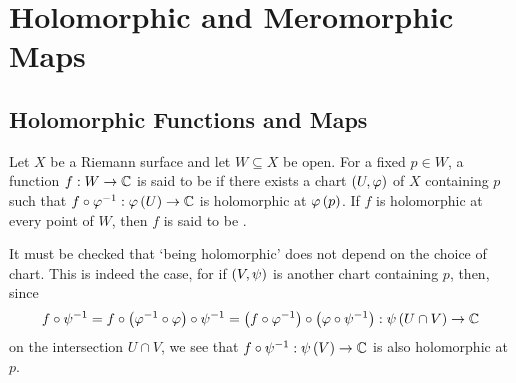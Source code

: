 \documentclass[../Moduli_Spaces_of_Riemann_Surfaces.tex]{subfiles}
\begin{document}
    \section{Holomorphic and Meromorphic Maps}
    \subsection{Holomorphic Functions and Maps}
    \begin{definition}
        Let $X$ be a Riemann surface and let $W\subseteq X$ be open. For a fixed $p\in W$, a function $f:W\to\mathbb{C}$ is said to be  if there exists a chart $\left(U,\varphi\right)$ of $X$ containing $p$ such that $f\circ\varphi^{-1}:\varphi\left(U\right)\to\mathbb{C}$ is holomorphic at $\varphi\left(p\right)$. If $f$ is holomorphic at every point of $W$, then $f$ is said to be .
    \end{definition}
    \begin{remark}
        It must be checked that $\textrm{`}$being holomorphic$\textrm{'}$ does not depend on the choice of chart. This is indeed the case, for if $\left(V,\psi\right)$ is another chart containing $p$, then, since
        \begin{equation*}
            f\circ\psi^{-1}=f\circ\left(\varphi^{-1}\circ\varphi\right)\circ\psi^{-1}=\left(f\circ\varphi^{-1}\right)\circ\left(\varphi\circ\psi^{-1}\right):\psi\left(U\cap V\right)\to\mathbb{C}
        \end{equation*}
        on the intersection $U\cap V$, we see that $f\circ\psi^{-1}:\psi\left(V\right)\to\mathbb{C}$ is also holomorphic at $p$.
    \end{remark}
\end{document}
